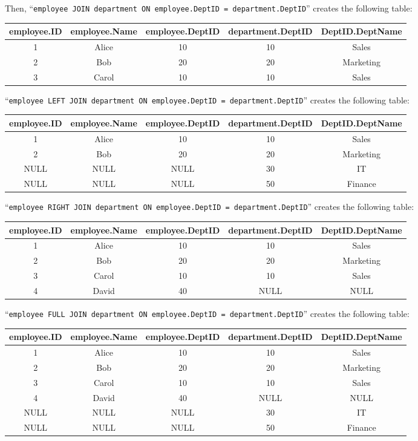 \documentclass{article}
\begin{document}
\begin{itemize}
		Then, ``\texttt{employee JOIN department ON employee.DeptID = department.DeptID}'' creates the following table:
		\begin{center}
			\begin{tabular}{|c|c|c|c|c|}
				employee.ID & employee.Name  & employee.DeptID & department.DeptID & DeptID.DeptName \\
				\hline
				1  & Alice & 10 & 10 & Sales\\
				2  & Bob   & 20 & 20 & Marketing\\
				3  & Carol & 10 & 10 & Sales
			\end{tabular}
		\end{center}
		
		``\texttt{employee LEFT JOIN department ON employee.DeptID = department.DeptID}'' creates the following table:
		\begin{center}
			\begin{tabular}{|c|c|c|c|c|}
				employee.ID & employee.Name  & employee.DeptID & department.DeptID & DeptID.DeptName \\
				\hline
				1  & Alice & 10 & 10 & Sales\\
				2  & Bob   & 20 & 20 & Marketing\\
				NULL  & NULL & NULL & 30 & IT\\
				NULL  & NULL & NULL & 50 & Finance
			\end{tabular}
		\end{center}
		
		``\texttt{employee RIGHT JOIN department ON employee.DeptID = department.DeptID}'' creates the following table:
		\begin{center}
			\begin{tabular}{|c|c|c|c|c|}
				employee.ID & employee.Name  & employee.DeptID & department.DeptID & DeptID.DeptName \\
				\hline
				1  & Alice & 10 & 10 & Sales\\
				2  & Bob   & 20 & 20 & Marketing\\
				3  & Carol & 10 & 10 & Sales\\
				4  & David & 40 & NULL & NULL
			\end{tabular}
		\end{center}
		
		``\texttt{employee FULL JOIN department ON employee.DeptID = department.DeptID}'' creates the following table:
		\begin{center}
			\begin{tabular}{|c|c|c|c|c|}
				employee.ID & employee.Name  & employee.DeptID & department.DeptID & DeptID.DeptName \\
				\hline
				1  & Alice & 10 & 10 & Sales\\
				2  & Bob   & 20 & 20 & Marketing\\
				3  & Carol & 10 & 10 & Sales\\
				4  & David & 40 & NULL & NULL\\
				NULL  & NULL & NULL & 30 & IT\\
				NULL  & NULL & NULL & 50 & Finance
			\end{tabular}
		\end{center}
		

\end{itemize}
\end{document}
